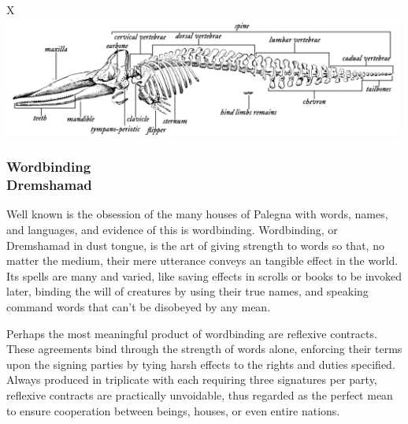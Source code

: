 \begin{linenumbers}

\begin{table}[b]%
    \begin{DndTable}[width=\linewidth]{X}
        \centering
        \includegraphics[width=0.99\textwidth]{01intro/img/23sperm_whale_skeleton.png}
    \end{DndTable}
\end{table}

\subsubsection{Wordbinding\\ \small{Dremshamad}} %
Well known is the obsession of the many houses of Palegna with words, names, and languages, and evidence of this is wordbinding.
Wordbinding, or Dremshamad in dust tongue, is the art of giving strength to words so that, no matter the medium, their mere utterance conveys an tangible effect in the world.
Its spells are many and varied, like saving effects in scrolls or books to be invoked later, binding the will of creatures by using their true names, and speaking command words that can't be disobeyed by any mean.

Perhaps the most meaningful product of wordbinding are reflexive contracts.
These agreements bind through the strength of words alone, enforcing their terms upon the signing parties by tying harsh effects to the rights and duties specified.
Always produced in triplicate with each requiring three signatures per party, reflexive contracts are practically unvoidable, thus regarded as the perfect mean to ensure cooperation between beings, houses, or even entire nations.



\end{linenumbers}
